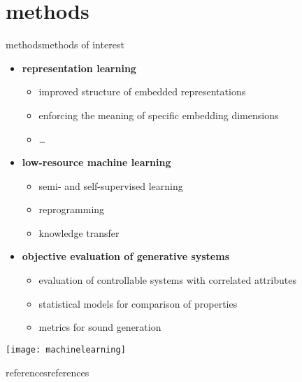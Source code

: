      \section[methods]{methods}
        \begin{frame}{methods}{methods of interest}
            \begin{itemize}
                \item   \textbf{representation learning}
                    \begin{itemize}
                        \item   improved structure of embedded representations \cite{seshadri_improving_2021, ma_representation_2022}
                        \item   enforcing the meaning of specific embedding dimensions \cite{pati_attribute-based_2020, pati_is_2021}
                        \item   \ldots
                    \end{itemize}
                 \bigskip
                 \item<2->  \textbf{low-resource machine learning}
                    \begin{itemize}
                        \item   semi- and self-supervised learning \cite{gururani_semi-supervised_2021, wu_labeled_2018}
                        \item   reprogramming \cite{chen_music_2023, hung_low-resource_2023}
                        \item   knowledge transfer \cite{hung_feature-informed_2022, ding_audio_2023, ding_embedding_2024}
                    \end{itemize}
                 \bigskip
                 \item<3->  \textbf{objective evaluation of generative systems}
                    \begin{itemize}
                        \item   evaluation of controllable systems with correlated attributes \cite{watcharasupat_evaluation_2021, watcharasupat_latte_2022}
                        \item   statistical models for comparison of properties \cite{yang_evaluation_2020}
                        \item   metrics for sound generation \cite{vinay_evaluating_2022}
                    \end{itemize}
            \end{itemize}
            \vspace{-40mm}
            \begin{flushright}
                \texttt{[image: machinelearning]}
            \end{flushright}
            \end{frame}
        
    
    
    \begin{frame}[allowframebreaks]{references}{references}
    \tiny
        \printbibliography
    \end{frame}


